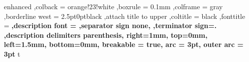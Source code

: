 {
    enhanced
    ,colback = orange!23!white
    ,boxrule = 0.1mm
    ,colframe = gray
    ,borderline west = {2.5pt}{0pt}{black}
    ,attach title to upper
    ,coltitle = black
    ,fonttitle = \bfseries
    ,description font = \mdseries
    ,separator sign none,
    ,terminator sign={.\hspace{2mm}}
    ,description delimiters parenthesis,
    right=1mm,
    top=0mm,
    left=1.5mm,
    bottom=0mm,
    breakable = true,
    arc = 3pt,
    outer arc = 3pt
}
{t}